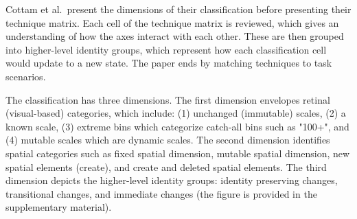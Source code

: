 Cottam et al.\ present the dimensions of their classification before presenting their technique matrix. Each cell of the technique matrix is reviewed, which gives an understanding of how the axes interact with each other. These are then grouped into higher-level identity groups, which represent how each classification cell would update to a new state. The paper ends by matching techniques to task scenarios.

The classification has three dimensions. The first dimension envelopes retinal (visual-based) categories, which include: (1) unchanged (immutable) scales, (2) a known scale, (3) extreme bins which categorize catch-all bins such as "100+", and (4) mutable scales which are dynamic scales. The second dimension identifies spatial categories such as fixed spatial dimension, mutable spatial dimension, new spatial elements (create), and create and deleted spatial elements. The third dimension depicts the higher-level identity groups: identity preserving changes, transitional changes, and immediate changes (the figure is provided in the supplementary material).


%

